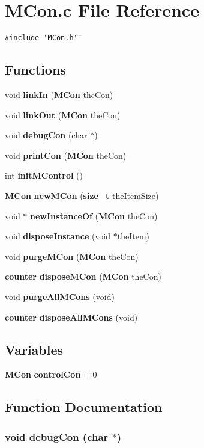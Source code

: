 \section{MCon.c File Reference}
\label{MCon_8c}
{\tt \#include \char`\"{}MCon.h\char`\"{}}\par
\subsection*{Functions}
\begin{CompactItemize}
\item 
void {\bf link\-In} ({\bf MCon} the\-Con)
\item 
void {\bf link\-Out} ({\bf MCon} the\-Con)
\item 
void {\bf debug\-Con} (char $\ast$)
\item 
void {\bf print\-Con} ({\bf MCon} the\-Con)
\item 
int {\bf init\-MControl} ()
\item 
{\bf MCon} {\bf new\-MCon} ({\bf size\_\-t} the\-Item\-Size)
\item 
void $\ast$ {\bf new\-Instance\-Of} ({\bf MCon} the\-Con)
\item 
void {\bf dispose\-Instance} (void $\ast$the\-Item)
\item 
void {\bf purge\-MCon} ({\bf MCon} the\-Con)
\item 
{\bf counter} {\bf dispose\-MCon} ({\bf MCon} the\-Con)
\item 
void {\bf purge\-All\-MCons} (void)
\item 
{\bf counter} {\bf dispose\-All\-MCons} (void)
\end{CompactItemize}
\subsection*{Variables}
\begin{CompactItemize}
\item 
{\bf MCon} {\bf control\-Con} = 0
\end{CompactItemize}


\subsection{Function Documentation}
\subsubsection{\setlength{\rightskip}{0pt plus 5cm}void debug\-Con (char $\ast$)}\label{MCon_8c_a3}


